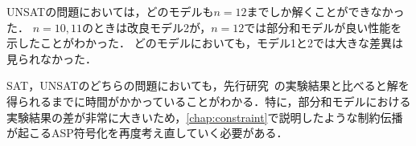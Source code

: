 UNSATの問題においては，どのモデルも$n=12$までしか解くことができなかった．
$n=10,11$のときは改良モデル2が，$n=12$では部分和モデルが良い性能を示したことがわかった．
どのモデルにおいても，モデル1と2では大きな差異は見られなかった．

SAT，UNSATのどちらの問題においても，先行研究~\cite{yamamoto21}の実験結果と比べると解を得られるまでに時間がかかっていることがわかる．特に，部分和モデルにおける実験結果の差が非常に大きいため，\ref{chap:constraint}で説明したような制約伝播が起こるASP符号化を再度考え直していく必要がある．
